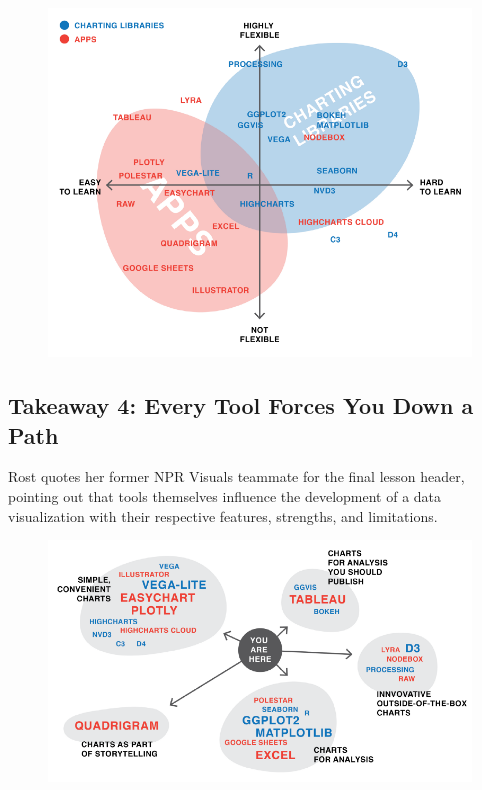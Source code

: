\documentclass[]{book}
\theoremstyle{definition}
\theoremstyle{definition}
\theoremstyle{definition}
\theoremstyle{remark}
\begin{document}
\begin{figure}
\centering
\includegraphics{images/apps_vs_code.png}
\caption{}
\end{figure}

\subsection{Takeaway 4: Every Tool Forces You Down a
Path}\label{takeaway-4-every-tool-forces-you-down-a-path}

Rost quotes her former NPR Visuals teammate for the final lesson header,
pointing out that tools themselves influence the development of a data
visualization with their respective features, strengths, and
limitations.

\begin{figure}
\centering
\includegraphics{images/tools_force_paths.png}
\caption{}
\end{figure}
\end{document}
